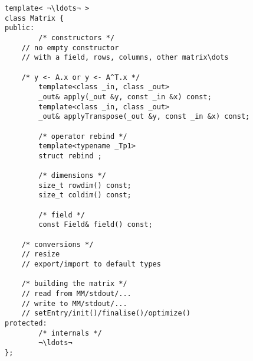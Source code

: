 {
	\small
\begin{lstlisting}
template< ¬\ldots¬ >
class Matrix {
public:
        /* constructors */
	// no empty constructor
	// with a field, rows, columns, other matrix\dots

	/* y <- A.x or y <- A^T.x */
        template<class _in, class _out>
        _out& apply(_out &y, const _in &x) const;
        template<class _in, class _out>
        _out& applyTranspose(_out &y, const _in &x) const;

        /* operator rebind */
        template<typename _Tp1>
        struct rebind ;

        /* dimensions */
        size_t rowdim() const;
        size_t coldim() const;

        /* field */
        const Field& field() const;

	/* conversions */
	// resize
	// export/import to default types

	/* building the matrix */
	// read from MM/stdout/...
	// write to MM/stdout/...
	// setEntry/init()/finalise()/optimize()
protected:
        /* internals */
        ¬\ldots¬
};
\end{lstlisting}
}
